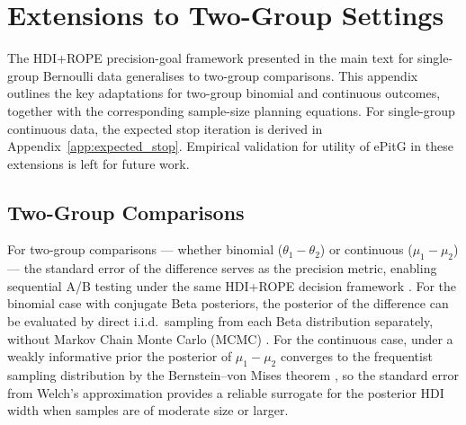 \section{Extensions to Two-Group Settings}\label{app:extensions}

The HDI+ROPE precision-goal framework presented in the main text for single-group
Bernoulli data generalises to two-group comparisons.
This appendix outlines the key adaptations for two-group binomial and continuous
outcomes, together with the corresponding sample-size planning equations.
For single-group continuous data, the expected stop iteration is derived in
Appendix~\ref{app:expected_stop}.
Empirical validation for utility of ePitG in these extensions is left for future work.

\subsection*{Two-Group Comparisons}

For two-group comparisons --- whether binomial ($\theta_1 - \theta_2$) or continuous
($\mu_1 - \mu_2$) --- the standard error of the difference serves as the precision
metric, enabling sequential A/B testing under the same HDI+ROPE decision framework
\citep{kruschke2013}.
For the binomial case with conjugate Beta posteriors, the posterior of the difference
can be evaluated by direct i.i.d.\ sampling from each Beta distribution separately,
without Markov Chain Monte Carlo (MCMC) \citep{gelman2013bayesian}.
For the continuous case, under a weakly informative prior the posterior of
$\mu_1 - \mu_2$ converges to the frequentist sampling distribution by the
Bernstein--von Mises theorem \citep{gelman2013bayesian}, so the standard error from
Welch's approximation provides a reliable surrogate for the posterior HDI width when
samples are of moderate size or larger.

